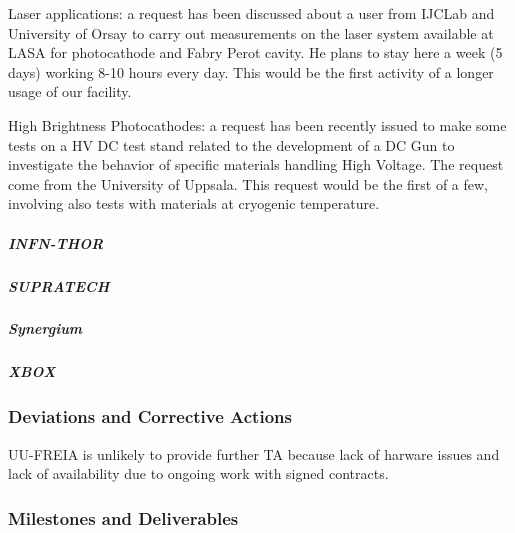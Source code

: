 Laser applications: a request has been discussed about a user from IJCLab and University of Orsay to carry out measurements on the laser system available at LASA for photocathode and Fabry Perot cavity. He plans to stay here a week (5 days) working 8-10 hours every day. This would be the first activity of a longer usage of our facility.

High Brightness Photocathodes: a request has been recently issued to make some tests on a HV DC test stand related to the development of a DC Gun to investigate the behavior of specific materials handling High Voltage. The request come from the University of Uppsala. This request would be the first of a few, involving also tests with materials at cryogenic temperature.


\subparagraph{INFN-THOR}

\subparagraph{SUPRATECH}

\subparagraph{Synergium}

\subparagraph{XBOX}



\subsubsection*{Deviations and Corrective Actions}


UU-FREIA is unlikely to provide further TA because lack of harware issues and lack of availability due to ongoing work with signed contracts. 

\subsubsection*{Milestones and Deliverables}


